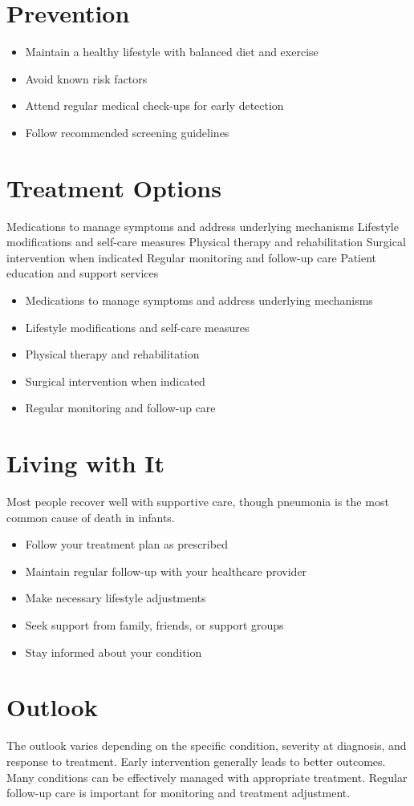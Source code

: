 \section{Prevention}
\begin{itemize}[noitemsep]
  \item Maintain a healthy lifestyle with balanced diet and exercise
  \item Avoid known risk factors
  \item Attend regular medical check-ups for early detection
  \item Follow recommended screening guidelines
\end{itemize}
\section{Treatment Options}
Medications to manage symptoms and address underlying mechanisms Lifestyle modifications and self-care measures Physical therapy and rehabilitation Surgical intervention when indicated Regular monitoring and follow-up care Patient education and support services

\begin{itemize}[noitemsep]
  \item Medications to manage symptoms and address underlying mechanisms
  \item Lifestyle modifications and self-care measures
  \item Physical therapy and rehabilitation
  \item Surgical intervention when indicated
  \item Regular monitoring and follow-up care
\end{itemize}
\section{Living with It}
Most people recover well with supportive care, though pneumonia is the most common cause of death in infants.

\begin{itemize}[noitemsep]
  \item Follow your treatment plan as prescribed
  \item Maintain regular follow-up with your healthcare provider
  \item Make necessary lifestyle adjustments
  \item Seek support from family, friends, or support groups
  \item Stay informed about your condition
\end{itemize}
\section{Outlook}
The outlook varies depending on the specific condition, severity at diagnosis, and response to treatment. Early intervention generally leads to better outcomes. Many conditions can be effectively managed with appropriate treatment. Regular follow-up care is important for monitoring and treatment adjustment.
